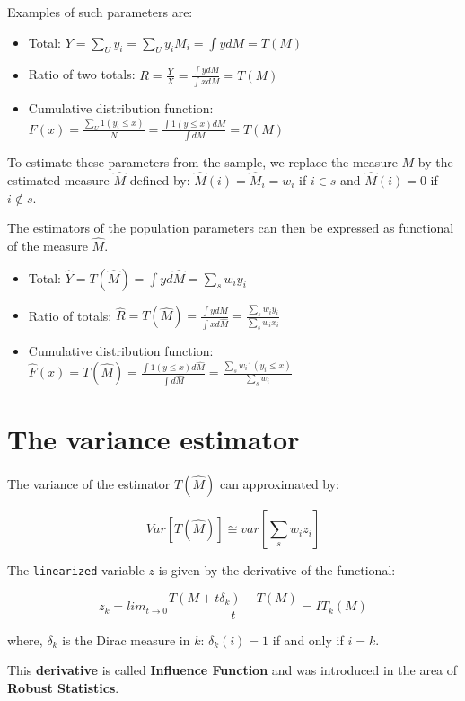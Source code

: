 \documentclass[]{book}
\begin{document}
Examples of such parameters are:

\begin{itemize}
\item
  Total: \(Y=\sum_Uy_i=\sum_U y_iM_i=\int ydM=T(M)\)
\item
  Ratio of two totals:
  \(R=\frac{Y}{X}=\frac{\int y dM}{\int x dM}=T(M)\)
\item
  Cumulative distribution function:
  \(F(x)=\frac{\sum_U 1(y_i\leq x)}{N}=\frac{\int 1(y\leq x)dM}{\int{dM}}=T(M)\)
\end{itemize}

To estimate these parameters from the sample, we replace the measure
\(M\) by the estimated measure \(\hat{M}\) defined by:
\(\hat{M}(i)=\hat{M}_i= w_i\) if \(i\in s\) and \(\hat{M}(i)=0\) if
\(i\notin s\).

The estimators of the population parameters can then be expressed as
functional of the measure \(\hat{M}\).

\begin{itemize}
\item
  Total: \(\hat{Y}=T(\hat{M})=\int yd\hat{M}=\sum_s w_iy_i\)
\item
  Ratio of totals:
  \(\hat{R}=T(\hat{M})=\frac{\int y d\hat{M}}{\int x d\hat{M}}=\frac{\sum_s w_iy_i}{\sum_s w_ix_i}\)
\item
  Cumulative distribution function:
  \(\hat{F}(x)=T(\hat{M})=\frac{\int 1(y\leq x)d\hat{M}}{\int{d\hat{M}}}=\frac{\sum_s w_i 1(y_i\leq x)}{\sum_s w_i}\)
\end{itemize}

\section{The variance estimator}\label{the-variance-estimator}

The variance of the estimator \(T(\hat{M})\) can approximated by:

\[Var\left[T(\hat{M})\right]\cong var\left[\sum_s w_i z_i\right]\]

The \texttt{linearized} variable \(z\) is given by the derivative of the
functional:

\[
z_k=lim_{t\rightarrow0}\frac{T(M+t\delta_k)-T(M)}{t}=IT_k(M)
\]

where, \(\delta_k\) is the Dirac measure in \(k\): \(\delta_k(i)=1\) if
and only if \(i=k\).

This \textbf{derivative} is called \textbf{Influence Function} and was
introduced in the area of \textbf{Robust Statistics}.
\end{document}
